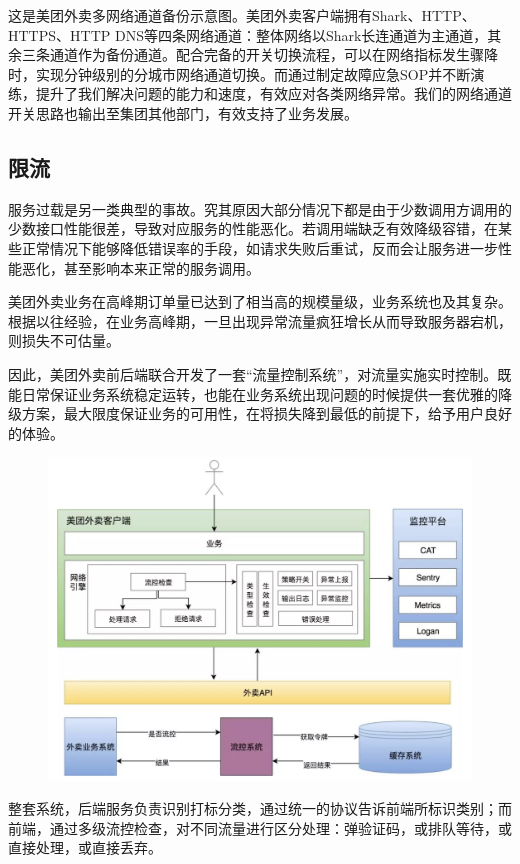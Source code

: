 \documentclass[12pt]{article}
\begin{document}
这是美团外卖多网络通道备份示意图。美团外卖客户端拥有Shark、HTTP、HTTPS、HTTP DNS等四条网络通道：整体网络以Shark长连通道为主通道，其余三条通道作为备份通道。配合完备的开关切换流程，可以在网络指标发生骤降时，实现分钟级别的分城市网络通道切换。而通过制定故障应急SOP并不断演练，提升了我们解决问题的能力和速度，有效应对各类网络异常。我们的网络通道开关思路也输出至集团其他部门，有效支持了业务发展。

\subsection{限流}
服务过载是另一类典型的事故。究其原因大部分情况下都是由于少数调用方调用的少数接口性能很差，导致对应服务的性能恶化。若调用端缺乏有效降级容错，在某些正常情况下能够降低错误率的手段，如请求失败后重试，反而会让服务进一步性能恶化，甚至影响本来正常的服务调用。

美团外卖业务在高峰期订单量已达到了相当高的规模量级，业务系统也及其复杂。根据以往经验，在业务高峰期，一旦出现异常流量疯狂增长从而导致服务器宕机，则损失不可估量。

因此，美团外卖前后端联合开发了一套“流量控制系统”，对流量实施实时控制。既能日常保证业务系统稳定运转，也能在业务系统出现问题的时候提供一套优雅的降级方案，最大限度保证业务的可用性，在将损失降到最低的前提下，给予用户良好的体验。

\begin{figure}[H]
    \centering
    \includegraphics[width=1\textwidth]{fig/Meituan_APP_High_9.png}
\end{figure}

整套系统，后端服务负责识别打标分类，通过统一的协议告诉前端所标识类别；而前端，通过多级流控检查，对不同流量进行区分处理：弹验证码，或排队等待，或直接处理，或直接丢弃。
\end{document}
